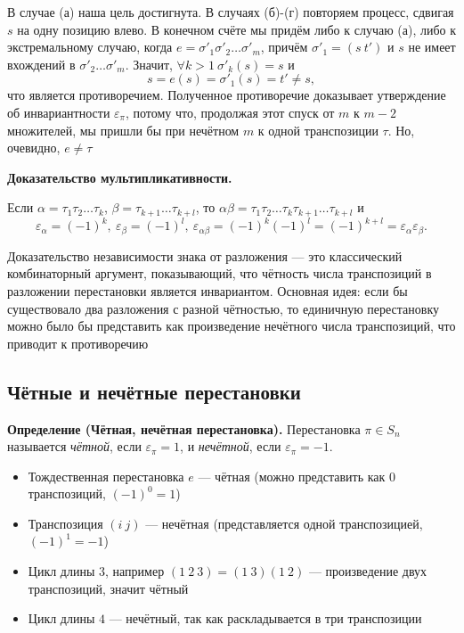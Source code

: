 \documentclass[a4paper,12pt]{article}
\theoremstyle{definition}
\theoremstyle{plain}
\theoremstyle{remark}
\begin{document}
	В случае (а) наша цель достигнута. В случаях (б)-(г) повторяем процесс, сдвигая $s$ на одну позицию влево. В конечном счёте мы придём либо к случаю (а), либо к экстремальному случаю, когда $e = \sigma'_1 \sigma'_2 \dots \sigma'_m$, причём $\sigma'_1 = (s\ t')$ и $s$ не имеет вхождений в $\sigma'_2 \dots \sigma'_m$. Значит, $\forall k > 1 \ \sigma'_k(s) = s$ и
	\[
	s = e(s) = \sigma'_1(s) = t' \neq s,
	\]
	что является противоречием. Полученное противоречие доказывает утверждение об инвариантности $\varepsilon_\pi$, потому что, продолжая этот спуск от $m$ к $m-2$ множителей, мы пришли бы при нечётном $m$ к одной транспозиции $\tau$. Но, очевидно, $e \neq \tau$
	
	\medskip
	\noindent \textbf{Доказательство мультипликативности.}
	
	Если $\alpha = \tau_1 \tau_2 \dots \tau_k$, $\beta = \tau_{k+1} \dots \tau_{k+l}$, то $\alpha \beta = \tau_1 \tau_2 \dots \tau_k \tau_{k+1} \dots \tau_{k+l}$ и
	\[
	\varepsilon_\alpha = (-1)^k,\ \varepsilon_\beta = (-1)^l,\ \varepsilon_{\alpha \beta} = (-1)^k (-1)^l = (-1)^{k+l} = \varepsilon_\alpha \varepsilon_\beta.
	\]
	
	\begin{tcolorbox}[colback=green!5, colframe=green!50!black, title=Пояснение к доказательству]
		Доказательство независимости знака от разложения — это классический комбинаторный аргумент, показывающий, что чётность числа транспозиций в разложении перестановки является инвариантом. Основная идея: если бы существовало два разложения с разной чётностью, то единичную перестановку можно было бы представить как произведение нечётного числа транспозиций, что приводит к противоречию
	\end{tcolorbox}
	
	\subsection{Чётные и нечётные перестановки}
	
	\noindent \textbf{Определение (Чётная, нечётная перестановка).}
	Перестановка $\pi \in S_n$ называется \textit{чётной}, если $\varepsilon_\pi = 1$, и \textit{нечётной}, если $\varepsilon_\pi = -1$.
	
	\begin{tcolorbox}[colback=gray!5, colframe=gray!50, title=Примеры]
		\begin{itemize}
			\item Тождественная перестановка $e$ — чётная (можно представить как $0$ транспозиций, $(-1)^0 = 1$)
			\item Транспозиция $(i\ j)$ — нечётная (представляется одной транспозицией, $(-1)^1 = -1$)
			\item Цикл длины $3$, например $(1\ 2\ 3) = (1\ 3)(1\ 2)$ — произведение двух транспозиций, значит чётный
			\item Цикл длины $4$ — нечётный, так как раскладывается в три транспозиции
		\end{itemize}
	\end{tcolorbox}
	
\end{document}
